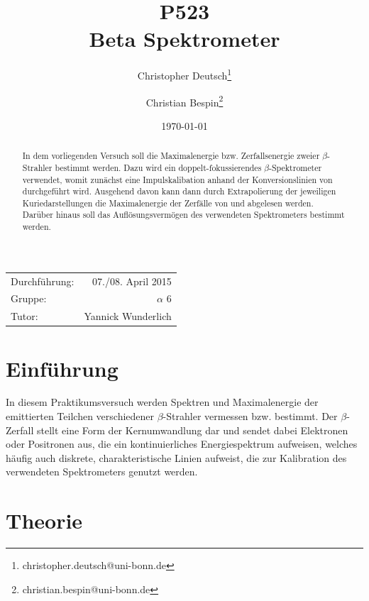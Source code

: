 \documentclass[11pt, a4paper]{article}
\title{P523 \\ Beta Spektrometer}
\author{Christopher Deutsch\footnote{christopher.deutsch@uni-bonn.de} \and Christian Bespin\footnote{christian.bespin@uni-bonn.de}}
\date{\today}
\numberwithin{equation}{section}
\begin{document}
\begin{titlepage}

\maketitle

\begin{center}
\begin{tabular}{l r}
Durchführung: & 07./08. April 2015 \\
Gruppe: & $\alpha$ 6 \\
Tutor: & Yannick Wunderlich
\end{tabular}
\end{center}

\begin{abstract}
\noindent In dem vorliegenden Versuch soll die Maximalenergie bzw. Zerfallsenergie zweier $\beta$-Strahler bestimmt werden.
Dazu wird ein doppelt-fokussierendes $\beta$-Spektrometer verwendet, womit zunächst eine Impulskalibation anhand der Konversionslinien von  durchgeführt wird.
Ausgehend davon kann dann durch Extrapolierung der jeweiligen Kuriedarstellungen die Maximalenergie der Zerfälle von  und  abgelesen werden.
Darüber hinaus soll das Auflösungsvermögen des verwendeten Spektrometers bestimmt werden.
\end{abstract}

\end{titlepage}

\tableofcontents
\newpage


\section{Einführung}

In diesem Praktikumsversuch werden Spektren und Maximalenergie der emittierten Teilchen verschiedener $\beta$-Strahler vermessen bzw. bestimmt.
Der $\beta$-Zerfall stellt eine Form der Kernumwandlung dar und sendet dabei Elektronen oder Positronen aus, die ein kontinuierliches Energiespektrum aufweisen, welches häufig auch diskrete, charakteristische Linien aufweist, die zur Kalibration des verwendeten Spektrometers genutzt werden.

\section{Theorie}
\end{document}
